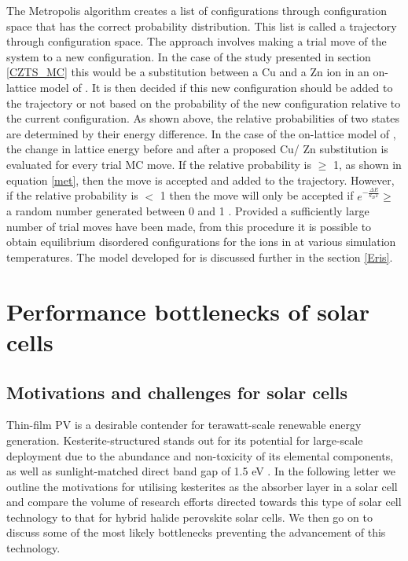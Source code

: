\documentclass[11pt, twoside]{report}
\begin{document}
The Metropolis algorithm creates a list of configurations through configuration space that has the correct probability distribution. This list is called a trajectory through configuration space. The approach involves making a trial move of the system to a new configuration. In the case of the study presented in section \ref{CZTS_MC} this would be a substitution between a Cu and a Zn ion in an on-lattice model of {\CZTS}. It is then decided if this new configuration should be added to the trajectory or not based on the probability of the new configuration relative to the current configuration. As shown above, the relative probabilities of two states are determined by their energy difference. In the case of the on-lattice model of {\CZTS}, the change in lattice energy before and after a proposed Cu/ Zn substitution is evaluated for every trial MC move. If the relative probability is  $\geq$ 1, as shown in equation \ref{met}, then the move is accepted and added to the trajectory. However, if the relative probability is $<$ 1 then the move will only be accepted if $e^{-\frac{\Delta E}{k_BT}} \ge$ a random number generated between 0 and 1 \cite{Lesar3}. Provided a sufficiently large number of trial moves have been made, from this procedure it is possible to obtain equilibrium disordered configurations for the ions in {\CZTS} at various simulation temperatures. The model developed for {\CZTS} is discussed further in the section \ref{Eris}.


 








\chapter{Performance bottlenecks of {\CZTS} solar cells}\label{chap:CZTS}
\section{Motivations and challenges for {\CZTS} solar cells}
Thin-film PV is a desirable contender for terawatt-scale renewable energy generation. Kesterite-structured {\CZTS} stands out for its potential for large-scale deployment due to the abundance and non-toxicity of its elemental components, as well as sunlight-matched direct band gap of 1.5 eV \cite{CZTS_rev}. In the following letter we outline the motivations for utilising kesterites as the absorber layer in a solar cell and compare the volume of research efforts directed towards this type of solar cell technology to that for hybrid halide perovskite solar cells. We then go on to discuss some of the most likely bottlenecks preventing the advancement of this technology.
\end{document}
